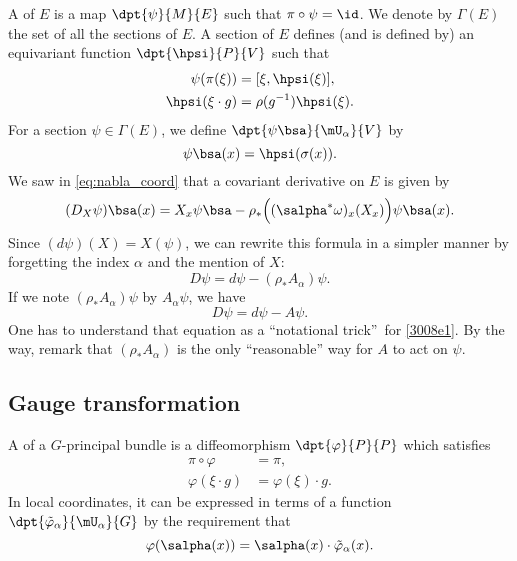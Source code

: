 A  of $E$ is a map $\dpt{\psi}{M}{E}$ such that $\pi\circ\psi=\id$. We denote by $\Gamma(E)$ the set of all the sections of $E$. A section of $E$ defines (and is defined by) an equivariant function $\dpt{\hpsi}{P}{V}$ such that
\begin{subequations}
\begin{align}
  \psi(\pi(\xi))&=[\xi,\hpsi(\xi)],\\
  \hpsi(\xi\cdot g)&=\rho(g^{-1})\hpsi(\xi).
\end{align}
\end{subequations}
For a section $\psi\in\Gamma(E)$, we define $\dpt{\psi\bsa}{\mU_{\alpha}}{V}$ by
 \[
 \psi\bsa(x)=\hpsi(\sigma(x)).
 \]
We saw in \eqref{eq:nabla_coord} that a covariant derivative on $E$ is given by
\begin{equation}\label{3008e1}
  (D_X\psi)\bsa(x)=X_x\psi\bsa-\rho_*\Big((\salpha^*\omega)_x(X_x)\Big)\psi\bsa(x).
\end{equation}
Since $(d\psi)(X)=X(\psi)$, we can rewrite this formula in a simpler manner by forgetting the index $\alpha$ and the mention of $X$:
\[
    D\psi=d\psi-(\rho_*A_{\alpha})\psi.
\]
If we note $(\rho_*A_{\alpha})\psi$ by $A_{\alpha}\psi$, we have
\begin{equation}
        D\psi=d\psi-A\psi.
\end{equation}
One has to understand that equation as a ``notational trick''\ for \eqref{3008e1}. By the way, remark that $(\rho_*A_{\alpha})$ is the only ``reasonable'' way for $A$ to act on $\psi$.

\subsection{Gauge transformation}

A  of a $G$-principal bundle is a diffeomorphism $\dpt{\varphi}{P}{P}$ which satisfies
\begin{subequations}
\begin{align}
   \pi\circ\varphi&=\pi,\\
   \varphi(\xi\cdot g)&=\varphi(\xi)\cdot g.
\end{align}
\end{subequations}
In local coordinates, it can be expressed in terms of a function $\dpt{\tilde{\varphi}_{\alpha}}{\mU_{\alpha}}{G}$ by the requirement that
\begin{equation}\label{def_vpt}
    \varphi(\salpha(x))=\salpha(x)\cdot\tilde{\varphi}_{\alpha}(x).
\end{equation}

